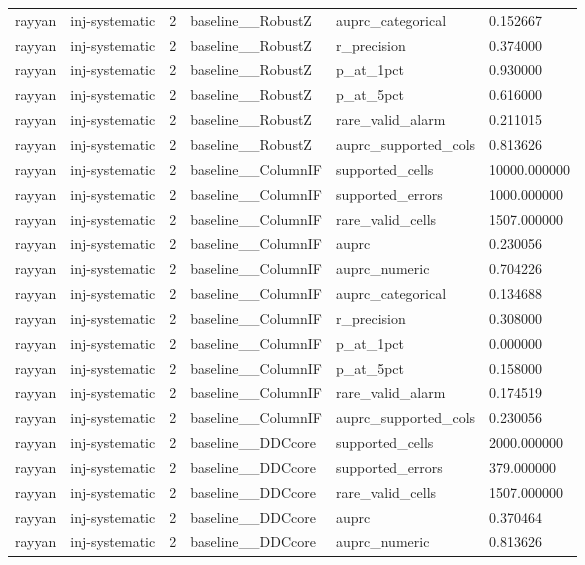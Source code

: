 \begin{tabular}{llllll}
rayyan & inj-systematic & 2 & baseline\_\_RobustZ & auprc\_categorical & 0.152667 \\
rayyan & inj-systematic & 2 & baseline\_\_RobustZ & r\_precision & 0.374000 \\
rayyan & inj-systematic & 2 & baseline\_\_RobustZ & p\_at\_1pct & 0.930000 \\
rayyan & inj-systematic & 2 & baseline\_\_RobustZ & p\_at\_5pct & 0.616000 \\
rayyan & inj-systematic & 2 & baseline\_\_RobustZ & rare\_valid\_alarm & 0.211015 \\
rayyan & inj-systematic & 2 & baseline\_\_RobustZ & auprc\_supported\_cols & 0.813626 \\
rayyan & inj-systematic & 2 & baseline\_\_ColumnIF & supported\_cells & 10000.000000 \\
rayyan & inj-systematic & 2 & baseline\_\_ColumnIF & supported\_errors & 1000.000000 \\
rayyan & inj-systematic & 2 & baseline\_\_ColumnIF & rare\_valid\_cells & 1507.000000 \\
rayyan & inj-systematic & 2 & baseline\_\_ColumnIF & auprc & 0.230056 \\
rayyan & inj-systematic & 2 & baseline\_\_ColumnIF & auprc\_numeric & 0.704226 \\
rayyan & inj-systematic & 2 & baseline\_\_ColumnIF & auprc\_categorical & 0.134688 \\
rayyan & inj-systematic & 2 & baseline\_\_ColumnIF & r\_precision & 0.308000 \\
rayyan & inj-systematic & 2 & baseline\_\_ColumnIF & p\_at\_1pct & 0.000000 \\
rayyan & inj-systematic & 2 & baseline\_\_ColumnIF & p\_at\_5pct & 0.158000 \\
rayyan & inj-systematic & 2 & baseline\_\_ColumnIF & rare\_valid\_alarm & 0.174519 \\
rayyan & inj-systematic & 2 & baseline\_\_ColumnIF & auprc\_supported\_cols & 0.230056 \\
rayyan & inj-systematic & 2 & baseline\_\_DDCcore & supported\_cells & 2000.000000 \\
rayyan & inj-systematic & 2 & baseline\_\_DDCcore & supported\_errors & 379.000000 \\
rayyan & inj-systematic & 2 & baseline\_\_DDCcore & rare\_valid\_cells & 1507.000000 \\
rayyan & inj-systematic & 2 & baseline\_\_DDCcore & auprc & 0.370464 \\
rayyan & inj-systematic & 2 & baseline\_\_DDCcore & auprc\_numeric & 0.813626 \\

\end{tabular}
